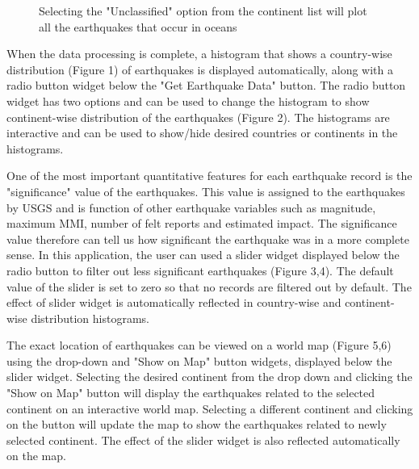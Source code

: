 \documentclass{article}
\begin{document}
		\begin{figure}
			\caption{Selecting the "Unclassified" option from the continent list will plot all the earthquakes that occur in oceans}
		\end{figure}
		
		When the data processing is complete, a histogram that shows a country-wise distribution (Figure 1) of earthquakes is displayed automatically, along with a radio button widget below the "Get Earthquake Data" button. The radio button widget has two options and can be used to change the histogram to show continent-wise distribution of the earthquakes (Figure 2). The histograms are interactive and can be used to show/hide desired countries or continents in the histograms.
			
		One of the most important quantitative features for each earthquake record is the "significance" value of the earthquakes. This value is assigned to the earthquakes by USGS and is function of other earthquake variables such as magnitude, maximum MMI, number of felt reports and estimated impact. The significance value therefore can tell us how significant the earthquake was in a more complete sense. In this application, the user can used a slider widget displayed below the radio button to filter out less significant earthquakes (Figure 3,4). The default value of the slider is set to zero so that no records are filtered out by default. The effect of slider widget is automatically reflected in country-wise and continent-wise distribution histograms.
		
		The exact location of earthquakes can be viewed on a world map (Figure 5,6) using the drop-down and "Show on Map" button widgets, displayed below the slider widget. Selecting the desired continent from the drop down and clicking the "Show on Map" button will display the earthquakes related to the selected continent on an interactive world map. Selecting a different continent and clicking on the button will update the map to show the earthquakes related to newly selected continent. The effect of the slider widget is also reflected automatically on the map.
		
\end{document}
